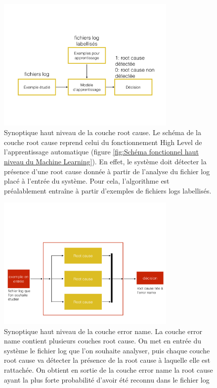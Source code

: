 \begin{figure}[h]
	\centering\includegraphics[height=6.5cm]{images/synoptique_root.png}
	\caption[Synoptique haut niveau de la couche root cause]{Synoptique haut niveau de la couche root cause. Le schéma de la couche root cause reprend celui du fonctionnement High Level de l'apprentissage automatique (figure \ref{fig:Schéma fonctionnel haut niveau du Machine Learning}). En effet, le système doit détecter la présence d'une root cause donnée à partir de l'analyse du fichier log placé à l'entrée du système. Pour cela, l'algorithme est préalablement entraîne à partir d'exemples de fichiers logs labellisés.}
	\label{fig:synoptique haut niveau de la solution proposée: couche root cause}
\end{figure}

\begin{figure}[h]
	\centering\includegraphics[height=6.5cm]{images/synoptique_error.png}
	\caption[Synoptique haut niveau de la couche error name]{Synoptique haut niveau de la couche error name. La couche error name contient plusieurs couches root cause. On met en entrée du système le fichier log que l'on souhaite analyser, puis chaque couche root cause va détecter la présence de la root cause à laquelle elle est rattachée. On obtient en sortie de la couche error name la root cause  ayant la plus forte probabilité d'avoir été reconnu dans le fichier log}
	\label{fig:synoptique haut niveau de la solution proposée: couche error name}
\end{figure}

